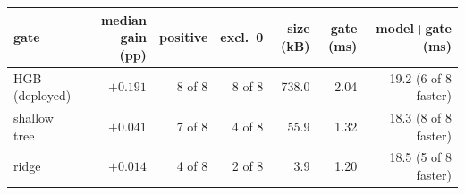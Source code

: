 \begin{tabular}{lrrrrrr}
\toprule
gate & median gain (pp) & positive & excl.\ 0 & size (kB) & gate (ms) & model+gate (ms) \\
\midrule
HGB (deployed) & $+0.191$ & 8 of 8 & 8 of 8 & 738.0 & 2.04 & 19.2 (6 of 8 faster) \\
shallow tree & $+0.041$ & 7 of 8 & 4 of 8 & 55.9 & 1.32 & 18.3 (8 of 8 faster) \\
ridge & $+0.014$ & 4 of 8 & 2 of 8 & 3.9 & 1.20 & 18.5 (5 of 8 faster) \\
\bottomrule
\end{tabular}
